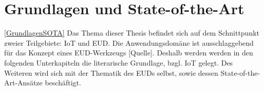\chapter{Grundlagen und State-of-the-Art}\ref{GrundlagenSOTA}
Das Thema dieser Thesis befindet sich auf dem Schnittpunkt zweier Teilgebiete: \ac{IoT} und \ac{EUD}. Die Anwendungsdomäne ist ausschlaggebend für das Konzept eines \ac{EUD}-Werkzeugs [Quelle]. Deshalb werden werden in den folgenden Unterkapiteln die literarische Grundlage, bzgl. \ac{IoT} gelegt. Des Weiteren wird sich mit der Thematik des \acp{EUD} selbst, sowie dessen State-of-the-Art-Ansätze beschäftigt.







